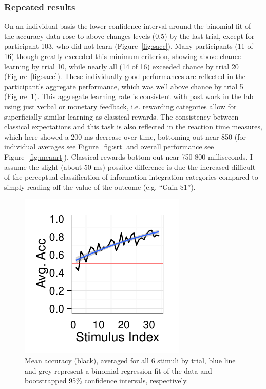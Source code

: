 \documentclass[doc,12pt]{apa}        %
\begin{document}
\subsubsection{Repeated results}
On an individual basis the lower confidence interval around the binomial fit of the accuracy data rose to above changes levels (0.5) by the last trial, except for participant 103, who did not learn (Figure~\ref{fig:sacc}).  Many participants (11 of 16) though greatly exceeded this minimum criterion, showing above chance learning by trial 10, while nearly all (14 of 16) exceeded chance by trial 20  (Figure~\ref{fig:sacc}).  These individually good performances are reflected in the participant's aggregate performance, which was well above chance by trial 5 (Figure~\ref{fig:meanacc}).  This aggregate learning rate is consistent with past work in the lab using just verbal or monetary feedback, i.e. rewarding categories allow for superficially similar learning as classical rewards.  The consistency between classical expectations and this task is also reflected in the reaction time measures, which here showed a 200 ms decrease over time, bottoming out near 850 (for individual averages see Figure~\ref{fig:srt} and overall performance see Figure~\ref{fig:meanrt}).  Classical rewards bottom out near 750-800 milliseconds.  I assume the slight (about 50 ms) possible difference is due the increased difficult of the perceptual classification of information integration categories compared to simply reading off the value of the outcome (e.g. ``Gain \$1'').

\begin{figure}[tp]
	\includegraphics{f_all_mean_acc}
    \centering
	\caption{Mean accuracy (black), averaged for all 6 stimuli by trial, blue line and grey represent a binomial regression fit of the data and bootstrapped 95\% confidence intervals, respectively.}
	\label{fig:meanacc}
\end{figure}
\end{document}
